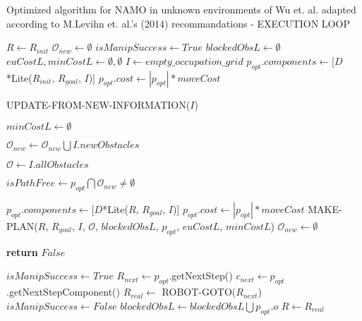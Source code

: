 \begin{algorithm}[H]

  \caption{Optimized algorithm for NAMO in unknown environments of Wu et. al. adapted according to M.Levihn et. al.'s (2014) recommandations - EXECUTION LOOP}

  \label{alg:02-levihn-makeandexecuteplan}

  \begin{algorithmic}[1]


      \State $R \gets R_{init}$ \label{lst:line:init1}
      \State $\mathcal{O}_{new} \gets \emptyset$
      \State $isManipSuccess \gets True$
      \State $blockedObsL \gets \emptyset$
      \State $euCostL, minCostL \gets \emptyset, \emptyset$ \label{lst:line:init2}
      \State $I \gets empty\_occupation\_grid$
      \State $p_{opt}.components \gets [D$*Lite($R_{init}$, $R_{goal}$, $I$)] 
      \State $p_{opt}.cost \gets |p_{opt}| * moveCost$


        \State UPDATE-FROM-NEW-INFORMATION($I$) 

          \State $minCostL \gets \emptyset$
        \EndIf

        \State $\mathcal{O}_{new} \gets \mathcal{O}_{new} \bigcup I.newObstacles$

        \State $\mathcal{O} \gets I.allObstacles$

        \State $isPathFree \gets p_{opt} \bigcap \mathcal{O}_{new} \neq \emptyset$

          \State $p_{opt}.components \gets [D$*Lite($R$, $R_{goal}$, $I$)]
          \State $p_{opt}.cost \gets |p_{opt}| * moveCost$
          \State MAKE-PLAN($R$, $R_{goal}$, $I$, $\mathcal{O}$, $blockedObsL$, $p_{opt}$, $euCostL$, $minCostL$)
          \State $\mathcal{O}_{new} \gets \emptyset$
        \EndIf

         \label{lst:line:exec1}
          \State \textbf{return} $False$
        \EndIf \label{lst:line:exec1bis}

        \State $isManipSuccess \gets True$ \label{lst:line:ismanipsuccess}
        \State $R_{next} \gets p_{opt}$.getNextStep() \label{lst:line:exec2bis}
        \State $c_{next} \gets p_{opt}$.getNextStepComponent()
        \State $R_{real} \gets$ ROBOT-GOTO($R_{next}$)
          \State $isManipSuccess \gets False$
          \State $blockedObsL \gets blockedObsL \bigcup p_{opt}.o$
        \EndIf
        \State $R \gets R_{real}$ \label{lst:line:exec2}


\end{algorithmic}
\end{algorithm}
